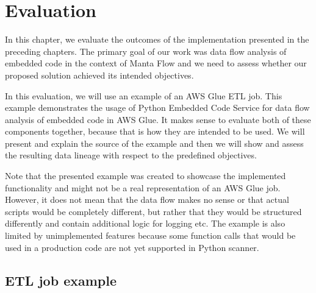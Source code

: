 \chapter{Evaluation}

In this chapter, we evaluate the outcomes of the implementation presented in the preceding chapters. The primary goal of our work was data flow analysis of embedded code in the context of Manta Flow and we need to assess whether our proposed solution achieved its intended objectives.
\par
In this evaluation, we will use an example of an AWS Glue ETL job. This example demonstrates the usage of Python Embedded Code Service for data flow analysis of embedded code in AWS Glue. It makes sense to evaluate both of these components together, because that is how they are intended to be used. We will present and explain the source of the example and then we will show and assess the resulting data lineage with respect to the predefined objectives.
\par
Note that the presented example was created to showcase the implemented functionality and might not be a real representation of an AWS Glue job. However, it does not mean that the data flow makes no sense or that actual scripts would be completely different, but rather that they would be structured differently and contain additional logic for logging etc. The example is also limited by unimplemented features because some function calls that would be used in a production code are not yet supported in Python scanner.

\section{ETL job example}

